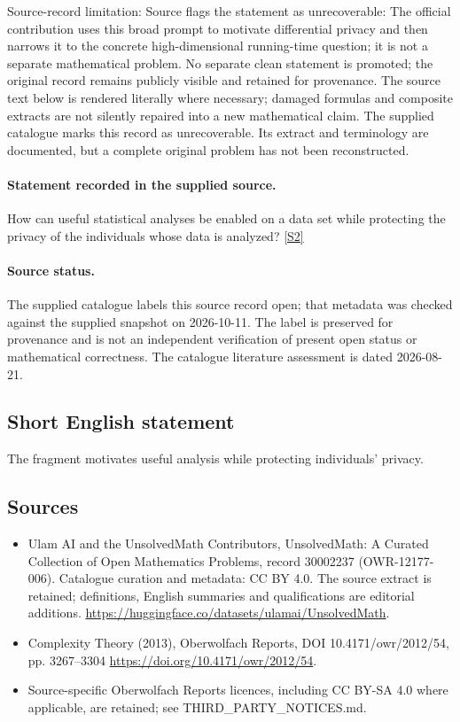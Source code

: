 \documentclass[11pt]{article}
\begin{document}
Source-record limitation: Source flags the statement as unrecoverable: The official contribution uses this broad prompt to motivate differential privacy and then narrows it to the concrete high-dimensional running-time question; it is not a separate mathematical problem. No separate clean statement is promoted; the original record remains publicly visible and retained for provenance.
The source text below is rendered literally where necessary; damaged formulas and composite extracts are not silently repaired into a new mathematical claim.
The supplied catalogue marks this record as unrecoverable. Its extract and terminology are documented, but a complete original problem has not been reconstructed.
\paragraph{Statement recorded in the supplied source.}
How can useful statistical analyses be enabled on a data set while protecting the privacy of the individuals whose data is analyzed? \href{https://doi.org/10.4171/owr/2012/54}{[S2]}
\paragraph{Source status.}
The supplied catalogue labels this source record open; that metadata was checked against the supplied snapshot on 2026-10-11. The label is preserved for provenance and is not an independent verification of present open status or mathematical correctness. The catalogue literature assessment is dated 2026-08-21.
\subsection{Short English statement}
The fragment motivates useful analysis while protecting individuals' privacy.
\subsection{Sources}
\begin{itemize}
\item[S1] Ulam AI and the UnsolvedMath Contributors, UnsolvedMath: A Curated Collection of Open Mathematics Problems, record 30002237 (OWR-12177-006). Catalogue curation and metadata: CC BY 4.0. The source extract is retained; definitions, English summaries and qualifications are editorial additions.
\url{https://huggingface.co/datasets/ulamai/UnsolvedMath}.
\item[S2] Complexity Theory (2013), Oberwolfach Reports, DOI 10.4171/owr/2012/54, pp. 3267--3304
\url{https://doi.org/10.4171/owr/2012/54}.
\item Source-specific Oberwolfach Reports licences, including CC BY-SA 4.0 where applicable, are retained; see THIRD\_PARTY\_NOTICES.md.
\end{itemize}
\end{document}
